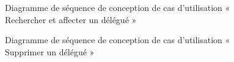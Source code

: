 \begin{figure}[H]
  \centering
  \caption{Diagramme de séquence de conception de cas d'utilisation «  Rechercher et affecter un délégué »}
  \label{fig:conception_sequence_search_affect_delegation}
\end{figure}

\begin{figure}[H]
  \centering
  \caption{Diagramme de séquence de conception de cas d'utilisation « Supprimer un délégué »}
  \label{fig:conception_sequence_annulation_delegation}
\end{figure}




